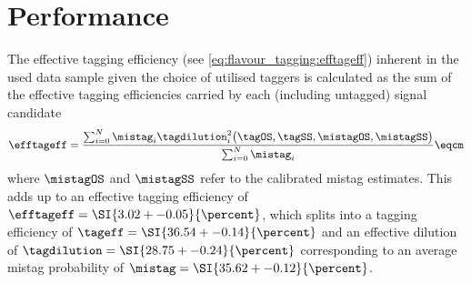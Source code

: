 \clearpage
\section{Performance}
\label{sec:flavour_tagging:performance}

The effective tagging efficiency (see \cref{eq:flavour_tagging:efftageff})
inherent in the used data sample given the choice of utilised taggers is
calculated as the sum of the effective tagging efficiencies carried by each
(including untagged) signal candidate
%
\begin{equation}
  \efftageff = \frac{\sum_{i=0}^{N} \mistag_i \tagdilution_i^2\big(\tagOS, \tagSS, \mistagOS, \mistagSS \big)}{\sum_{i=0}^{N} \mistag_i}\eqcm
\end{equation}
%
where $\mistagOS$ and $\mistagSS$ refer to the calibrated mistag estimates. This
adds up to an effective tagging efficiency of $\efftageff = \SI{3.02 +-
0.05}{\percent}$, which splits into a tagging efficiency of $\tageff = \SI{36.54
+- 0.14}{\percent}$ and an effective dilution of $\tagdilution = \SI{28.75 +-
0.24}{\percent}$ corresponding to an average mistag probability of $\mistag =
\SI{35.62 +- 0.12}{\percent}$.

